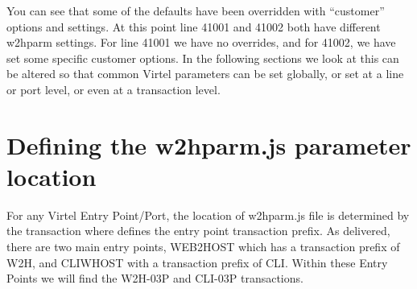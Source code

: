 \documentclass[letterpaper,10pt,english]{sphinxmanual}
\begin{document}
\begin{sphinxVerbatim}[commandchars=\\\{\}]
        
       
    \PYG{p}{[}\PYG{p}{]}
\end{sphinxVerbatim}

You can see that some of the defaults have been overridden with “customer” options and settings. At this point line 41001 and 41002 both have different w2hparm settings. For line 41001 we have no overrides, and for 41002, we have set some specific customer options. In the following sections we look at this can be altered so that common Virtel parameters can be set globally, or set at a line or port level, or even at a transaction level.


\section{Defining the w2hparm.js parameter location}
\label{\detokenize{TN202002:defining-the-w2hparm-js-parameter-location}}
For any Virtel Entry Point/Port, the location of w2hparm.js file is determined by the transaction  where  defines the entry point transaction prefix. As delivered, there are two main entry points, WEB2HOST which has a transaction prefix of W2H, and CLIWHOST with a transaction prefix of CLI. Within these Entry Points we will find the W2H-03P and CLI-03P transactions.

\end{document}
